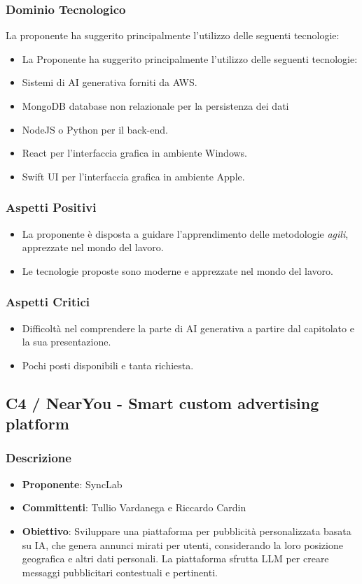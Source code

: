 \documentclass[a4paper, 12pt]{article}
\begin{document}
\subsubsection{Dominio Tecnologico}
La proponente ha suggerito principalmente l'utilizzo delle seguenti tecnologie:
\begin{itemize}
    \item La Proponente ha suggerito principalmente l’utilizzo delle seguenti tecnologie:
    \item Sistemi di AI generativa forniti da AWS.
    \item MongoDB database non relazionale per la persistenza dei dati 
    \item NodeJS o Python per il back-end.
    \item React per l’interfaccia grafica in ambiente Windows.
    \item Swift UI per l’interfaccia grafica in ambiente Apple.
\end{itemize}

\subsubsection{Aspetti Positivi}
\begin{itemize}
    \item La proponente è disposta a guidare l’apprendimento delle metodologie \textit{agili}, apprezzate nel mondo del lavoro.
    \item Le tecnologie proposte sono moderne e apprezzate nel mondo del lavoro.
\end{itemize}

\subsubsection{Aspetti Critici}
\begin{itemize}
    \item Difficoltà nel comprendere la parte di AI generativa a partire dal capitolato e la sua presentazione.
    \item Pochi posti disponibili e tanta richiesta.
\end{itemize}

\subsection{C4 / NearYou - Smart custom advertising platform}
\subsubsection{Descrizione}
\begin{itemize}
    \item \textbf{Proponente}: SyncLab 
    \item \textbf{Committenti}: Tullio Vardanega e Riccardo Cardin
    \item \textbf{Obiettivo}: Sviluppare una piattaforma per pubblicità personalizzata basata su IA, che genera annunci mirati per utenti, considerando la loro posizione geografica e altri dati personali. La piattaforma sfrutta LLM per creare messaggi pubblicitari contestuali e pertinenti.
\end{itemize}
\end{document}
